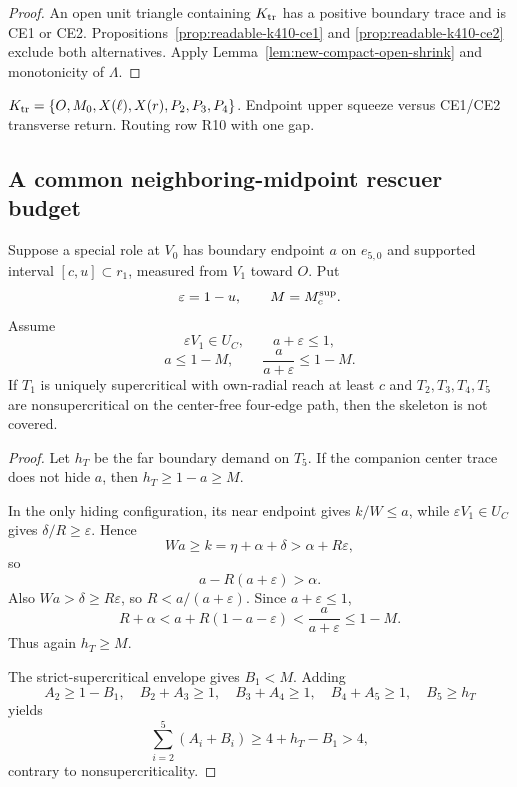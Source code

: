 \begin{proof}
An open unit triangle containing $K_{\rm tr}$ has a positive boundary trace
and is CE1 or CE2.  Propositions~\ref{prop:readable-k410-ce1} and
\ref{prop:readable-k410-ce2} exclude both alternatives.  Apply
Lemma~\ref{lem:new-compact-open-shrink} and monotonicity of $\Lambda$.
\end{proof}

{$K_{\rm tr}=\{O,M_0,X(\ell),X(r),P_2,P_3,P_4\}$.}
{Endpoint upper squeeze versus CE1/CE2 transverse return.}
{Routing row R10 with one gap.}

\subsection{A common neighboring-midpoint rescuer budget}

\begin{lemma}
\label{lem:readable-rescuer-tail-budget}
Suppose a special role at $V_0$ has boundary endpoint $a$ on $e_{5,0}$ and
supported interval $[c,u]\subset r_1$, measured from $V_1$ toward $O$.
Put
\[
 \varepsilon=1-u,\qquad M=M_c^{\rm sup}.
\]
Assume
\[
 \varepsilon V_1\in U_C,\qquad a+\varepsilon\le1,
\]
\[
 a\le1-M,\qquad
 \frac{a}{a+\varepsilon}\le1-M.
 \tag{6.41}
\]
If $T_1$ is uniquely supercritical with own-radial reach at least $c$ and
$T_2,T_3,T_4,T_5$ are nonsupercritical on the center-free four-edge path,
then the skeleton is not covered.
\end{lemma}

\begin{proof}
Let $h_T$ be the far boundary demand on $T_5$.  If the companion center trace
does not hide $a$, then $h_T\ge1-a\ge M$.

In the only hiding configuration, its near endpoint gives $k/W\le a$, while
$\varepsilon V_1\in U_C$ gives $\delta/R\ge\varepsilon$.  Hence
\[
 Wa\ge k=\eta+\alpha+\delta>\alpha+R\varepsilon,
\]
so
\[
 a-R(a+\varepsilon)>\alpha.
\]
Also $Wa>\delta\ge R\varepsilon$, so
$R<a/(a+\varepsilon)$.  Since $a+\varepsilon\le1$,
\[
 R+\alpha
 <a+R(1-a-\varepsilon)
 <\frac{a}{a+\varepsilon}
 \le1-M.
\]
Thus again $h_T\ge M$.

The strict-supercritical envelope gives $B_1<M$.  Adding
\[
 A_2\ge1-B_1,\quad
 B_2+A_3\ge1,\quad B_3+A_4\ge1,\quad B_4+A_5\ge1,
 \quad B_5\ge h_T
\]
yields
\[
 \sum_{i=2}^5(A_i+B_i)\ge4+h_T-B_1>4,
\]
contrary to nonsupercriticality.
\end{proof}

